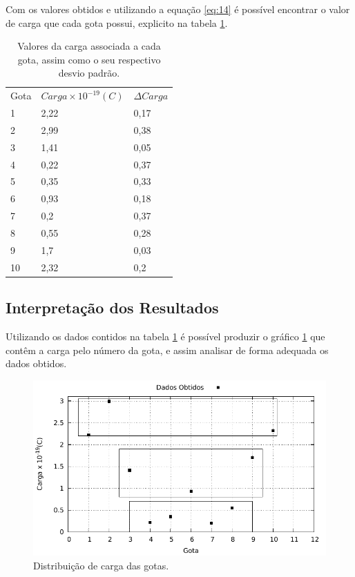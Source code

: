 Com os valores obtidos e  utilizando a equação \ref{eq:14} é possível encontrar o valor de carga que cada gota possui, explicito na tabela \ref{tab:Car}.
\begin{table}[!htb]
\centering
\begin{tabular}{l|ll|}
Gota & $Carga \times 10^{-19} (C)$ & $\Delta Carga$ \\
\rowcolor[HTML]{C0C0C0}
1    & 2,22                        & 0,17           \\ 
2    & 2,99                        & 0,38           \\
\rowcolor[HTML]{C0C0C0} 
3    & 1,41                        & 0,05           \\
4    & 0,22                        & 0,37           \\
\rowcolor[HTML]{C0C0C0} 
5    & 0,35                        & 0,33           \\
6    & 0,93                        & 0,18           \\
\rowcolor[HTML]{C0C0C0} 
7    & 0,2                         & 0,37           \\
8    & 0,55                        & 0,28           \\
\rowcolor[HTML]{C0C0C0} 
9   & 1,7                         & 0,03           \\
10   & 2,32                        & 0,2            \\ \hline
\end{tabular}
\caption{Valores da carga associada a cada gota, assim como o seu respectivo desvio padrão.}
\label{tab:Car}
\end{table}



\subsection{Interpretação dos Resultados}
Utilizando os dados contidos na tabela \ref{tab:Car} é possível produzir o gráfico \ref{im:Car} que contêm a carga pelo número da gota, e assim analisar de forma adequada os dados obtidos.

\begin{figure}[!htb]
	\centering
		\includegraphics[scale= 1]{grafico/gotas.pdf}
	\caption{Distribuição de carga das gotas.}
	\label{im:Car}
\end{figure}

